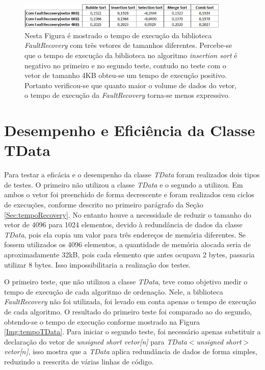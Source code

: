 \begin{figure}[h]
	\centering
	\includegraphics[width=0.9\textwidth]{figuras/tempoRecovery2.jpg}
	\caption[Tempo de execução da biblioteca \textit{FaultRecovery} com três tamanhos de vetores diferentes.]{Nesta Figura é mostrado o tempo de execução da biblioteca \textit{FaultRecovery} com três vetores de tamanhos diferentes. Percebe-se que o tempo de execução da biblioteca no algoritmo \textit{insertion sort} é negativo no primeiro e no segundo teste, contudo no teste com o vetor de tamanho 4KB obteu-se um tempo de execução positivo. Portanto verificou-se que quanto maior o volume de dados do vetor, o tempo de execução da \textit{FaultRecovery} torna-se menos expressivo.}
	\label{Img:tempoRecovery2}	
\end{figure}
\newpage
\section{Desempenho e Eficiência da Classe TData} \label{Sec:tempoTData}

Para testar a eficácia e o desempenho da classe \textit{TData} foram realizados dois tipos de testes. O primeiro não utilizou a classe \textit{TData} e o segundo a utilizou. Em ambos o vetor foi preenchido de forma decrescente e foram realizados cem ciclos de execuções, conforme descrito no primeiro parágrafo da Seção \ref{Sec:tempoRecovery}. No entanto houve a necessidade de reduzir o tamanho do vetor de 4096 para 1024 elementos, devido à redundância de dados da classe \textit{TData}, pois ela copia um valor para três endereços de memória diferentes. Se fossem utilizados os 4096 elementos, a quantidade de memória alocada seria de aproximadamente 32kB, pois cada elemento que antes ocupava 2 bytes, passaria  utilizar 8 bytes. Isso impossibilitaria a realização dos testes. 


O primeiro teste, que não utilizou a classe \textit{TData}, teve como objetivo medir o tempo de execução de cada algoritmo de ordenação. Nele, a biblioteca \textit{FaultRecovery} não foi utilizada, foi levado em conta apenas o tempo de execução de cada algoritmo. O resultado do primeiro teste foi comparado ao do segundo, obtendo-se o tempo de execução conforme mostrado na Figura \ref{Img:tempoTData}. Para iniciar o segundo teste, foi necessário apenas substituir a declaração do vetor de \textit{unsigned short vetor[n]} para \textit{TData$<$unsigned short$>$ vetor[$n$]}, isso mostra que a \textit{TData} aplica redundância de dados de forma simples, reduzindo a reescrita de várias linhas de código.

